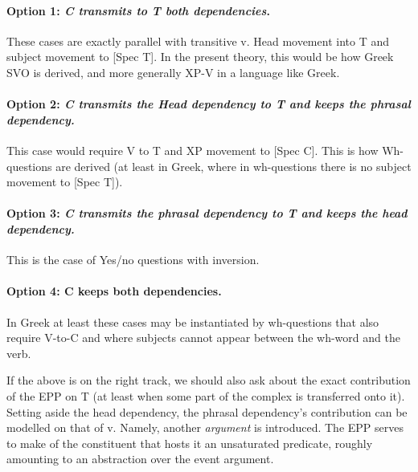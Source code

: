 \documentclass[11pt]{article}
\begin{document}
\paragraph*{Option 1: \textit{C transmits to T both dependencies}.}  These cases are exactly parallel with transitive v.  Head movement into T and subject movement to [Spec T].  In the present theory, this would be how Greek SVO is derived, and more generally XP-V in a language like Greek.

\paragraph*{Option 2:  \textit{C transmits the Head dependency to T and keeps the phrasal dependency.}}  This case would require V to T and XP movement to [Spec C].  This is how Wh-questions are derived (at least in Greek, where in wh-questions there is no subject movement to [Spec T]).

\paragraph*{Option 3:  \textit{C transmits the phrasal dependency to T and keeps the head dependency.}}  This is the case of Yes/no questions with  inversion.

\paragraph*{Option 4: C keeps both dependencies.}  In Greek at least these cases may be instantiated by wh-questions that also require V-to-C and where subjects cannot appear between the wh-word and the verb.

If the above is on the right track, we should also ask about the exact contribution of the EPP on T (at least when some part of the complex is transferred onto it).  Setting aside the head dependency, the phrasal dependency's contribution can be modelled on that of v.  Namely, another \textit{argument} is introduced.  The EPP serves to make of the constituent that hosts it an unsaturated predicate, roughly amounting to an abstraction over the event argument.
\end{document}
